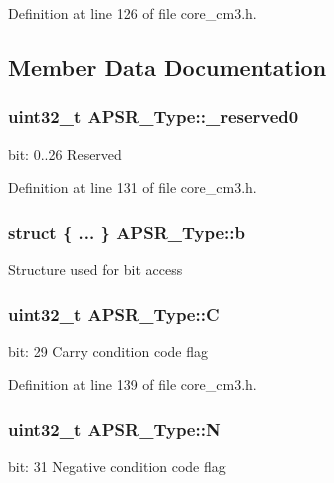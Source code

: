 \-Definition at line 126 of file core\-\_\-cm3.\-h.



\subsection{\-Member \-Data \-Documentation}
\hypertarget{union_a_p_s_r___type_afbce95646fd514c10aa85ec0a33db728}{
\subsubsection[{\-\_\-reserved0}]{\setlength{\rightskip}{0pt plus 5cm}uint32\-\_\-t {\bf \-A\-P\-S\-R\-\_\-\-Type\-::\-\_\-reserved0}}}\label{union_a_p_s_r___type_afbce95646fd514c10aa85ec0a33db728}
bit\-: 0..26 \-Reserved 

\-Definition at line 131 of file core\-\_\-cm3.\-h.

\hypertarget{union_a_p_s_r___type_a7dbc79a057ded4b11ca5323fc2d5ab14}{
\subsubsection[{b}]{\setlength{\rightskip}{0pt plus 5cm}struct \{ ... \}   {\bf \-A\-P\-S\-R\-\_\-\-Type\-::b}}}\label{union_a_p_s_r___type_a7dbc79a057ded4b11ca5323fc2d5ab14}
\-Structure used for bit access \hypertarget{union_a_p_s_r___type_a86e2c5b891ecef1ab55b1edac0da79a6}{
\subsubsection[{\-C}]{\setlength{\rightskip}{0pt plus 5cm}uint32\-\_\-t {\bf \-A\-P\-S\-R\-\_\-\-Type\-::\-C}}}\label{union_a_p_s_r___type_a86e2c5b891ecef1ab55b1edac0da79a6}
bit\-: 29 \-Carry condition code flag 

\-Definition at line 139 of file core\-\_\-cm3.\-h.

\hypertarget{union_a_p_s_r___type_a7e7bbba9b00b0bb3283dc07f1abe37e0}{
\subsubsection[{\-N}]{\setlength{\rightskip}{0pt plus 5cm}uint32\-\_\-t {\bf \-A\-P\-S\-R\-\_\-\-Type\-::\-N}}}\label{union_a_p_s_r___type_a7e7bbba9b00b0bb3283dc07f1abe37e0}
bit\-: 31 \-Negative condition code flag 


